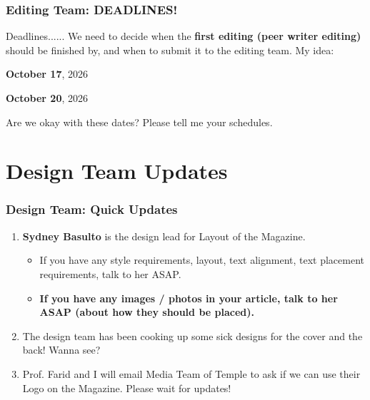 \documentclass{beamer}
\begin{document}
\begin{frame}
    \frametitle{Editing Team: DEADLINES!} 

    Deadlines...... We need to decide when the \textbf{first editing (peer writer editing)} should be finished by, and when to submit it to the editing team. My idea:

    \hspace{0.4px}

    \begin{description}
        
        \item<2->[Peer Writers' Deadline] \textbf{October 17}, 2026

        \item<3->[Editors' Deadline] \textbf{October 20}, 2026

    \end{description}

    \hspace{0.4px}

    \pause
    \pause
    \pause
    Are we okay with these dates? Please tell me your schedules.

\end{frame}


\section{Design Team Updates}
\begin{frame}
    \frametitle{Design Team: Quick Updates} 

    \begin{enumerate}

        \item<1-> \textbf{Sydney Basulto} is the design lead for Layout of the Magazine. 

            \begin{itemize}

                \item<2-> If you have any style requirements, layout, text alignment, text placement requirements, talk to her ASAP.

                \item<3-> \textbf{If you have any images / photos in your article, talk to her ASAP (about how they should be placed).}

            \end{itemize}

        \item<4-> The design team has been cooking up some sick designs for the cover and the back! Wanna see?

        \item<5-> Prof. Farid and I will email Media Team of Temple to ask if we can use their Logo on the Magazine. Please wait for updates! 

    \end{enumerate}

\end{frame}
\end{document}
